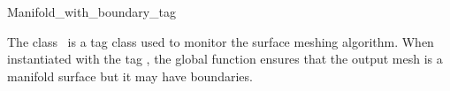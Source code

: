 

\begin{ccRefClass}{Manifold_with_boundary_tag}  %


\ccDefinition
  
The class \ccRefName\ is a tag class used to monitor the
surface meshing algorithm. When instantiated with the tag
\ccRefName, the global function 
ensures that the output mesh  is a  manifold surface
but it may have boundaries.










\ccSeeAlso

 \\
 \\




\end{ccRefClass}


